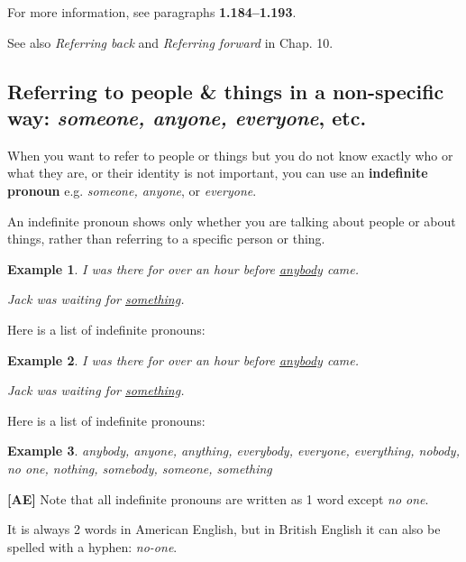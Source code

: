 \documentclass[oneside]{book}
\numberwithin{equation}{section}
\newtheorem{example}{Example}[section]
\begin{document}
For more information, see paragraphs \textbf{1.184--1.193}.

See also \textit{Referring back} and \textit{Referring forward} in Chap. 10.

\subsection{Referring to people \& things in a non-specific way: \textit{someone, anyone, everyone}, etc.}
\noindent{} When you want to refer to people or things but you do not know exactly who or what they are, or their identity is not important, you can use an \textbf{indefinite pronoun} e.g. \textit{someone, anyone}, or \textit{everyone}.

An indefinite pronoun shows only whether you are talking about people or about things, rather than referring to a specific person or thing.
\begin{example}
    I was there for over an hour before \underline{anybody} came.
    
    Jack was waiting for \underline{something}.
\end{example}
Here is a list of indefinite pronouns:
\begin{example}
    I was there for over an hour before \underline{anybody} came.
    
    Jack was waiting for \underline{something}.
\end{example}
Here is a list of indefinite pronouns:
\begin{example}
    anybody, anyone, anything, everybody, everyone, everything, nobody, no one, nothing, somebody, someone, something
\end{example}
\textbf{[AE]} Note that all indefinite pronouns are written as 1 word except \textit{no one}.

It is always 2 words in American English, but in British English it can also be spelled with a hyphen: \textit{no-one}.
\end{document}
